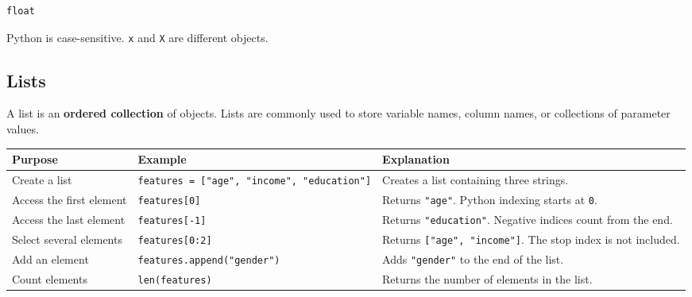 \documentclass[
  letterpaper,
  DIV=11,
  numbers=noendperiod]{scrreprt}
\newcounter{none} %
\theoremstyle{definition}
\theoremstyle{definition}
\theoremstyle{plain}
\theoremstyle{plain}
\theoremstyle{remark}
\begin{document}
\begin{verbatim}
float
\end{verbatim}

Python is case-sensitive. \texttt{x} and \texttt{X} are different
objects.

\subsection{Lists}\label{lists-1}

A list is an \textbf{ordered collection} of objects. Lists are commonly
used to store variable names, column names, or collections of parameter
values.

{\def\LTcaptype{none} %
\begin{longtable}[]{@{}
  >{\raggedright\arraybackslash}p{}
  >{\raggedright\arraybackslash}p{}
  >{\raggedright\arraybackslash}p{}@{}}
\toprule\noalign{}
\begin{minipage}[b]{\linewidth}\raggedright
Purpose
\end{minipage} & \begin{minipage}[b]{\linewidth}\raggedright
Example
\end{minipage} & \begin{minipage}[b]{\linewidth}\raggedright
Explanation
\end{minipage} \\
\midrule\noalign{}
\endhead
\bottomrule\noalign{}
\endlastfoot
Create a list &
\texttt{features\ =\ {[}"age",\ "income",\ "education"{]}} & Creates a
list containing three strings. \\
Access the first element & \texttt{features{[}0{]}} & Returns
\texttt{"age"}. Python indexing starts at \texttt{0}. \\
Access the last element & \texttt{features{[}-1{]}} & Returns
\texttt{"education"}. Negative indices count from the end. \\
Select several elements & \texttt{features{[}0:2{]}} & Returns
\texttt{{[}"age",\ "income"{]}}. The stop index is not included. \\
Add an element & \texttt{features.append("gender")} & Adds
\texttt{"gender"} to the end of the list. \\
Count elements & \texttt{len(features)} & Returns the number of elements
in the list. \\
\end{longtable}
}
\end{document}
